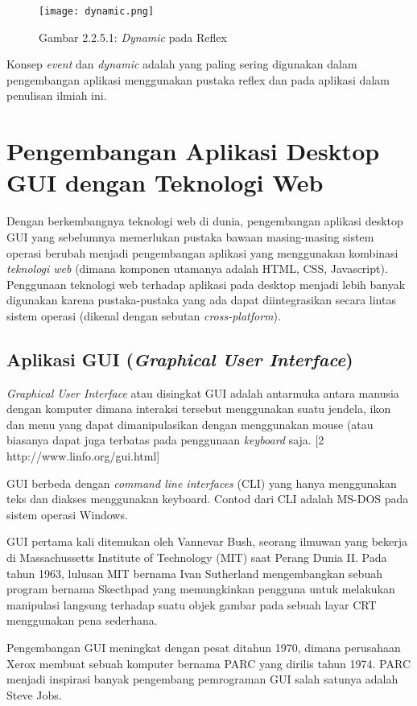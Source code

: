 \documentclass[pi.tex]{subfile}
\begin{document}
\begin{figure}[H]
  \texttt{[image: dynamic.png]}
  
  {Gambar 2.2.5.1: \emph{Dynamic} pada Reflex}
  \centering
\end{figure}

Konsep \emph{event} dan \emph{dynamic} adalah yang paling sering digunakan dalam pengembangan aplikasi menggunakan pustaka reflex dan pada aplikasi dalam penulisan ilmiah ini.

\section{Pengembangan Aplikasi Desktop GUI dengan Teknologi Web}
Dengan berkembangnya teknologi web di dunia, pengembangan aplikasi desktop GUI yang sebelumnya memerlukan pustaka bawaan masing-masing sistem operasi berubah menjadi pengembangan aplikasi yang menggunakan kombinasi \emph{teknologi web} (dimana komponen utamanya adalah HTML, CSS, Javascript). Penggunaan teknologi web terhadap aplikasi pada desktop menjadi lebih banyak digunakan karena pustaka-pustaka yang ada dapat diintegrasikan secara lintas sistem operasi (dikenal dengan sebutan \emph{cross-platform}).

\subsection{Aplikasi GUI (\emph{Graphical User Interface})}

\emph{Graphical User Interface} atau disingkat GUI adalah antarmuka antara manusia dengan komputer dimana interaksi tersebut menggunakan suatu jendela, ikon dan menu yang dapat dimanipulasikan dengan menggunakan mouse (atau biasanya dapat juga terbatas pada penggunaan \emph{keyboard} saja. [2 http://www.linfo.org/gui.html]

GUI berbeda dengan \emph{command line interfaces} (CLI) yang hanya menggunakan teks dan diakses menggunakan keyboard. Contod dari CLI adalah MS-DOS pada sistem operasi Windows.

GUI pertama kali ditemukan oleh Vannevar Bush, seorang ilmuwan yang bekerja di Massachussetts Institute of Technology (MIT) saat Perang Dunia II. Pada tahun 1963, lulusan MIT bernama Ivan Sutherland mengembangkan sebuah program bernama Skecthpad yang memungkinkan pengguna untuk melakukan manipulasi langsung terhadap suatu objek gambar pada sebuah layar CRT menggunakan pena sederhana.

Pengembangan GUI meningkat dengan pesat ditahun 1970, dimana perusahaan Xerox membuat sebuah komputer bernama PARC yang dirilis tahun 1974. PARC menjadi inspirasi banyak pengembang pemrograman GUI salah satunya adalah Steve Jobs.
\end{document}

